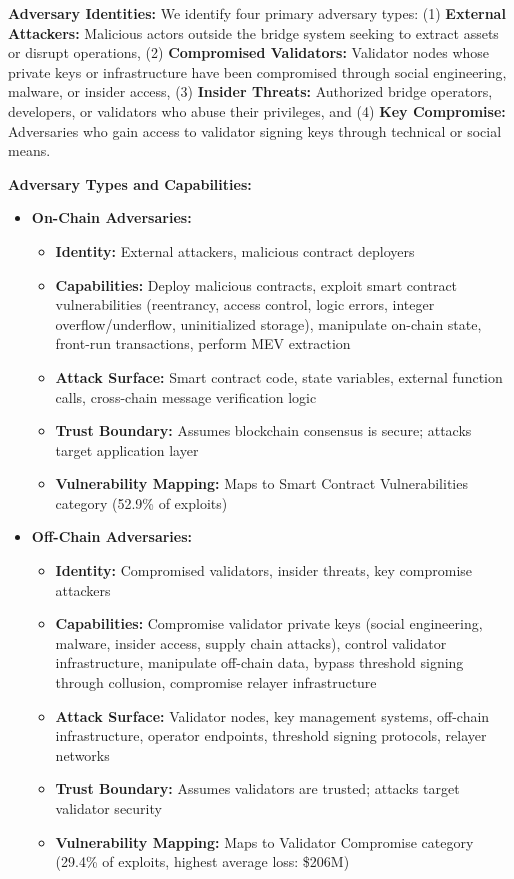 \documentclass[runningheads]{llncs}
\begin{document}
\textbf{Adversary Identities:} We identify four primary adversary types: (1) \textbf{External Attackers:} Malicious actors outside the bridge system seeking to extract assets or disrupt operations, (2) \textbf{Compromised Validators:} Validator nodes whose private keys or infrastructure have been compromised through social engineering, malware, or insider access, (3) \textbf{Insider Threats:} Authorized bridge operators, developers, or validators who abuse their privileges, and (4) \textbf{Key Compromise:} Adversaries who gain access to validator signing keys through technical or social means.

\textbf{Adversary Types and Capabilities:}
\begin{itemize}
    \item \textbf{On-Chain Adversaries:} 
    \begin{itemize}
        \item \textbf{Identity:} External attackers, malicious contract deployers
        \item \textbf{Capabilities:} Deploy malicious contracts, exploit smart contract vulnerabilities (reentrancy, access control, logic errors, integer overflow/underflow, uninitialized storage), manipulate on-chain state, front-run transactions, perform MEV extraction
        \item \textbf{Attack Surface:} Smart contract code, state variables, external function calls, cross-chain message verification logic
        \item \textbf{Trust Boundary:} Assumes blockchain consensus is secure; attacks target application layer
        \item \textbf{Vulnerability Mapping:} Maps to Smart Contract Vulnerabilities category (52.9\% of exploits)
    \end{itemize}
    
    \item \textbf{Off-Chain Adversaries:}
    \begin{itemize}
        \item \textbf{Identity:} Compromised validators, insider threats, key compromise attackers
        \item \textbf{Capabilities:} Compromise validator private keys (social engineering, malware, insider access, supply chain attacks), control validator infrastructure, manipulate off-chain data, bypass threshold signing through collusion, compromise relayer infrastructure
        \item \textbf{Attack Surface:} Validator nodes, key management systems, off-chain infrastructure, operator endpoints, threshold signing protocols, relayer networks
        \item \textbf{Trust Boundary:} Assumes validators are trusted; attacks target validator security
        \item \textbf{Vulnerability Mapping:} Maps to Validator Compromise category (29.4\% of exploits, highest average loss: \$206M)
    \end{itemize}
    

\end{itemize}
\end{document}
